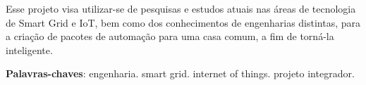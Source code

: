\begin{resumo}
Esse projeto visa utilizar-se de pesquisas e estudos atuais nas áreas de tecnologia de Smart Grid e IoT, bem como dos conhecimentos de engenharias distintas, para a criação de pacotes de automação para uma casa comum, a fim de torná-la inteligente.
 \vspace{\onelineskip}

 \noindent
 \textbf{Palavras-chaves}: engenharia. smart grid. internet of things. projeto integrador.
\end{resumo}
